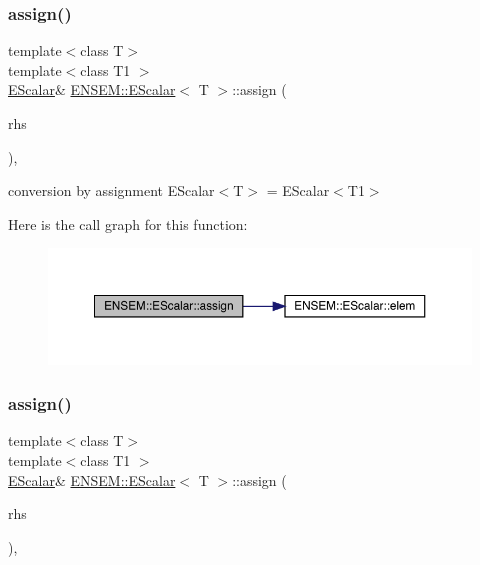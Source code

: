 \subsubsection{\texorpdfstring{assign()}{assign()}\hspace{0.1cm}{\footnotesize\ttfamily [7/9]}}
{\footnotesize\ttfamily template$<$class T$>$ \\
template$<$class T1 $>$ \\
\mbox{\hyperlink{classENSEM_1_1EScalar}{E\+Scalar}}\& \mbox{\hyperlink{classENSEM_1_1EScalar}{E\+N\+S\+E\+M\+::\+E\+Scalar}}$<$ T $>$\+::assign (\begin{DoxyParamCaption}\item[{const \mbox{\hyperlink{classENSEM_1_1EScalar}{E\+Scalar}}$<$ T1 $>$ \&}]{rhs }\end{DoxyParamCaption})\hspace{0.3cm}{\ttfamily [inline]}, {\ttfamily [protected]}}



conversion by assignment E\+Scalar$<$\+T$>$ = E\+Scalar$<$\+T1$>$ 

Here is the call graph for this function\+:
\nopagebreak
\begin{figure}[H]
\begin{center}
\leavevmode
\includegraphics[width=350pt]{d0/d82/classENSEM_1_1EScalar_aa9a54e03830d13eb6a124c64c6a46dd1_cgraph}
\end{center}
\end{figure}
\mbox{\label{classENSEM_1_1EScalar_aa9a54e03830d13eb6a124c64c6a46dd1}} 
\subsubsection{\texorpdfstring{assign()}{assign()}\hspace{0.1cm}{\footnotesize\ttfamily [8/9]}}
{\footnotesize\ttfamily template$<$class T$>$ \\
template$<$class T1 $>$ \\
\mbox{\hyperlink{classENSEM_1_1EScalar}{E\+Scalar}}\& \mbox{\hyperlink{classENSEM_1_1EScalar}{E\+N\+S\+E\+M\+::\+E\+Scalar}}$<$ T $>$\+::assign (\begin{DoxyParamCaption}\item[{const \mbox{\hyperlink{classENSEM_1_1EScalar}{E\+Scalar}}$<$ T1 $>$ \&}]{rhs }\end{DoxyParamCaption})\hspace{0.3cm}{\ttfamily [inline]}, {\ttfamily [protected]}}



